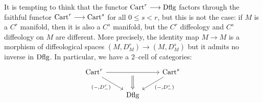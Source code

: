 \documentclass[11pt]{amsart}
\begin{document}
\begin{warn}
It is tempting to think that the functor $\Cart^r \to \Dflg$ factors through the faithful functor
$\Cart^r \to \Cart^{s}$ for all $0 \leq s < r$, but this is not the case:
if $M$ is a $C^r$ manifold, then it is also a $C^s$ manifold, but the $C^r$
diffeology and $C^s$ diffeology on $M$ are different. More precisely, the identity
map $M \to M$ is a morphism of diffeological spaces $(M, D^r_M) \to (M, D^s_M)$
but it admits no inverse in $\mathrm{Dflg}$. In particular, we have a $2$--cell of categories:
\[\begin{tikzcd}
\Cart^r \ar[rd, "{(-, D^r_{-})}" below left] \ar[rr, ""{below, name=S}] & &
\Cart^s \ar[ld, "{(-, D^s_{-})}" below right] \\
& \Dflg &
\ar[from=S, to=2-2, Rightarrow]
\end{tikzcd}\]
\end{warn}
\end{document}
